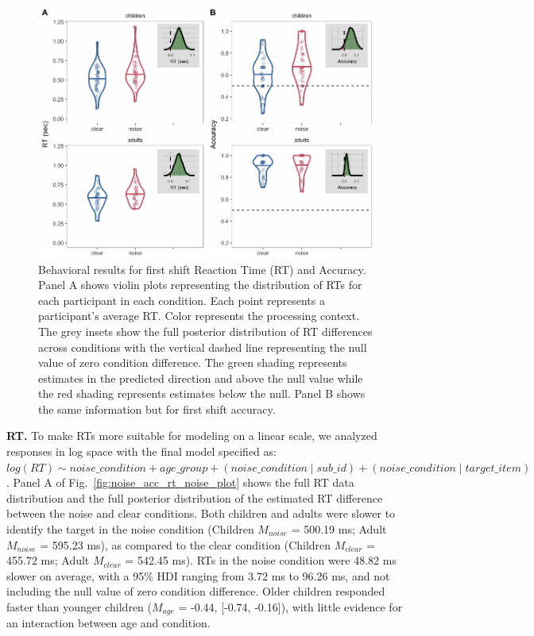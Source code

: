 \documentclass[english,man]{apa6}
\theoremstyle{definition}
\theoremstyle{definition}
\theoremstyle{definition}
\theoremstyle{remark}
\begin{document}
\begin{figure}[tb]

{\centering \includegraphics[width=0.8\linewidth]{figs/noise-acc-rt-1} 

}

\caption{Behavioral results for first shift Reaction Time (RT) and Accuracy. Panel A shows violin plots representing the distribution of RTs for each participant in each condition. Each point represents a participant's average RT. Color represents the processing context. The grey insets show the full posterior distribution of RT differences across conditions with the vertical dashed line representing the null value of zero condition difference. The green shading represents estimates in the predicted direction and above the null value while the red shading represents estimates below the null. Panel B shows the same information but for first shift accuracy.}\label{fig:noise-acc-rt}
\end{figure}

\textbf{RT.} To make RTs more suitable for modeling on a linear scale,
we analyzed responses in log space with the final model specified as:
\texttt{$log(RT) \sim noise\_condition + age\_group + (noise\_condition \mid sub\_id ) + (noise\_condition \mid target\_item)$}.
Panel A of Fig.~\ref{fig:noise_acc_rt_noise_plot} shows the full RT data
distribution and the full posterior distribution of the estimated RT
difference between the noise and clear conditions. Both children and
adults were slower to identify the target in the noise condition
(Children \(M_{noise}\) = 500.19 ms; Adult \(M_{noise}\) = 595.23 ms),
as compared to the clear condition (Children \(M_{clear}\) = 455.72 ms;
Adult \(M_{clear}\) = 542.45 ms). RTs in the noise condition were 48.82
ms slower on average, with a 95\% HDI ranging from 3.72 ms to 96.26 ms,
and not including the null value of zero condition difference. Older
children responded faster than younger children (\(M_{age}\) = -0.44,
{[}-0.74, -0.16{]}), with little evidence for an interaction between age
and condition.
\end{document}
